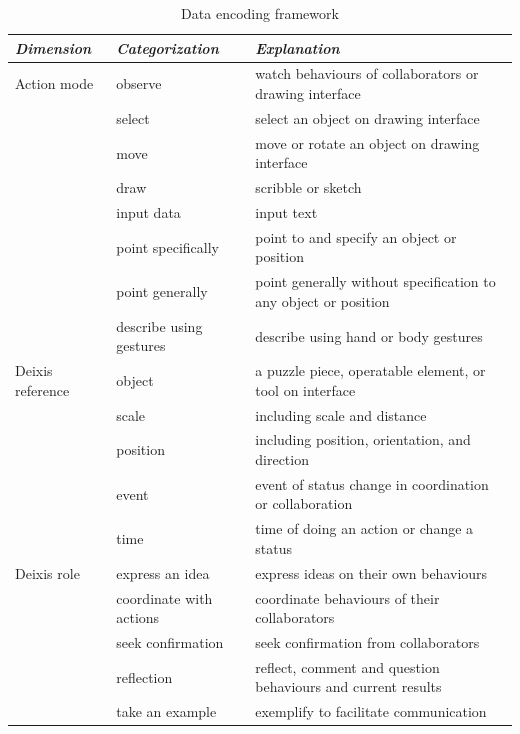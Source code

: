 \documentclass[12pt,twoside]{article}
\begin{document}
\begin{table}
  \centering
  \begin{tabular}{l l l}
    {\small\textit{Dimension}}
    & {\small \textit{Categorization}}
    & {\small \textit{Explanation}} \\
    \midrule
    Action mode & observe & watch behaviours of collaborators or drawing interface \\
       & select & select an object on drawing interface \\
     & move & move or rotate an object on drawing interface \\
     & draw & scribble or sketch\\
     & input data & input text \\
     & point specifically & point to and specify an object or position \\
     & point generally & point generally without specification to any object or position\\
     & describe using gestures & describe using hand or body gestures\\     
     \midrule
    Deixis reference & object & a puzzle piece, operatable element, or tool on interface\\
     & scale & including scale and distance \\
      & position & including position, orientation, and direction \\
      &event & event of status change in coordination or collaboration\\
      &time & time of doing an action or change a status\\
      \midrule
    Deixis role & express an idea & express ideas on their own behaviours \\
    & coordinate with actions & coordinate behaviours of their collaborators\\
    & seek confirmation & seek confirmation from collaborators\\
    & reflection & reflect, comment and question behaviours and current results\\
    & take an example & exemplify to facilitate communication\\
  \end{tabular}
  \caption{Data encoding framework}~\label{tab:tableFramework}
\end{table}

\end{document}

